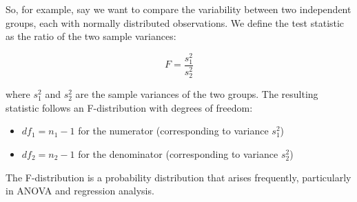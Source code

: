 \documentclass[
  letterpaper,
]{book}
\providecommand{\tightlist}{%
  \setlength{\itemsep}{0pt}\setlength{\parskip}{0pt}}\usepackage{longtable,booktabs,array}
\begin{document}
So, for example, say we want to compare the variability between two
independent groups, each with normally distributed observations. We
define the test statistic as the ratio of the two sample variances:

\[
F = \frac{s_1^2}{s_2^2}
\]

where \(s_1^2\) and \(s_2^2\) are the sample variances of the two
groups. The resulting statistic follows an F-distribution with degrees
of freedom:

\begin{itemize}
\tightlist
\item
  \(df_1 = n_1 - 1\) for the numerator (corresponding to variance
  \(s_1^2\))
\item
  \(df_2 = n_2 - 1\) for the denominator (corresponding to variance
  \(s_2^2\))
\end{itemize}

The F-distribution is a probability distribution that arises frequently,
particularly in ANOVA and regression analysis.
\end{document}
